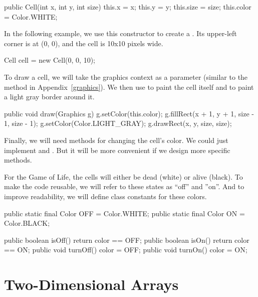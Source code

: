 \begin{code}
public Cell(int x, int y, int size) {
    this.x = x;
    this.y = y;
    this.size = size;
    this.color = Color.WHITE;
}
\end{code}

In the following example, we use this constructor to create a .
Its upper-left corner is at (0, 0), and the cell is 10x10 pixels wide.

\begin{code}
Cell cell = new Cell(0, 0, 10);
\end{code}

To draw a cell, we will take the graphics context as a parameter (similar to the  method in Appendix~\ref{graphics}).
We then use  to paint the cell itself and  to paint a light gray border around it.

\begin{code}
public void draw(Graphics g) {
    g.setColor(this.color);
    g.fillRect(x + 1, y + 1, size - 1, size - 1);
    g.setColor(Color.LIGHT_GRAY);
    g.drawRect(x, y, size, size);
}
\end{code}

Finally, we will need methods for changing the cell's color.
We could just implement  and .
But it will be more convenient if we design more specific methods.

For the Game of Life, the cells will either be dead (white) or alive (black).
To make the code reusable, we will refer to these states as ``off'' and ''on''.
And to improve readability, we will define class constants for these colors.

\begin{code}
public static final Color OFF = Color.WHITE;
public static final Color ON = Color.BLACK;

public boolean isOff() {
    return color == OFF;
}
public boolean isOn() {
    return color == ON;
}
public void turnOff() {
    color = OFF;
}
public void turnOn() {
    color = ON;
}
\end{code}


\section{Two-Dimensional Arrays}

